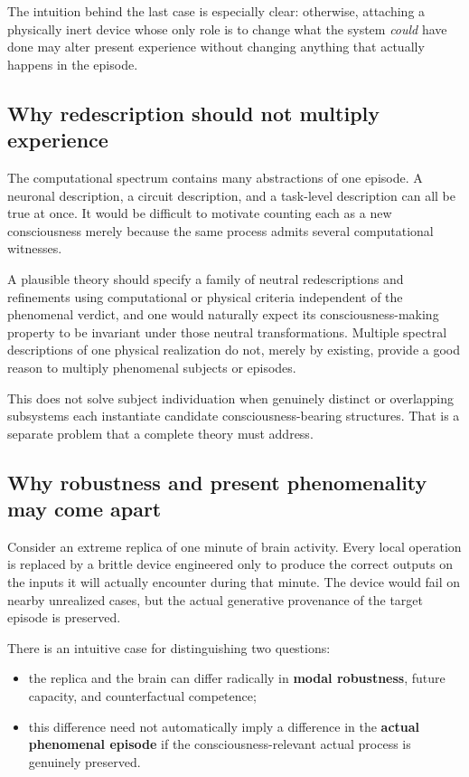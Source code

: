 \documentclass[11pt,a4paper]{article}
\begin{document}
The intuition behind the last case is especially clear: otherwise, attaching a physically inert device whose only role is to change what the system \emph{could} have done may alter present experience without changing anything that actually happens in the episode.

\subsection{Why redescription should not multiply experience}

The computational spectrum contains many abstractions of one episode. A neuronal description, a circuit description, and a task-level description can all be true at once. It would be difficult to motivate counting each as a new consciousness merely because the same process admits several computational witnesses.

\begin{principlebox}[title={Abstraction Consistency: a natural expectation}]
A plausible theory should specify a family of neutral redescriptions and refinements using computational or physical criteria independent of the phenomenal verdict, and one would naturally expect its consciousness-making property to be invariant under those neutral transformations. Multiple spectral descriptions of one physical realization do not, merely by existing, provide a good reason to multiply phenomenal subjects or episodes.
\end{principlebox}

This does not solve subject individuation when genuinely distinct or overlapping subsystems each instantiate candidate consciousness-bearing structures. That is a separate problem that a complete theory must address.

\subsection{Why robustness and present phenomenality may come apart}

Consider an extreme replica of one minute of brain activity. Every local operation is replaced by a brittle device engineered only to produce the correct outputs on the inputs it will actually encounter during that minute. The device would fail on nearby unrealized cases, but the actual generative provenance of the target episode is preserved.

There is an intuitive case for distinguishing two questions:

\begin{itemize}
  \item the replica and the brain can differ radically in \textbf{modal robustness}, future capacity, and counterfactual competence;
  \item this difference need not automatically imply a difference in the \textbf{actual phenomenal episode} if the consciousness-relevant actual process is genuinely preserved.
\end{itemize}
\end{document}
